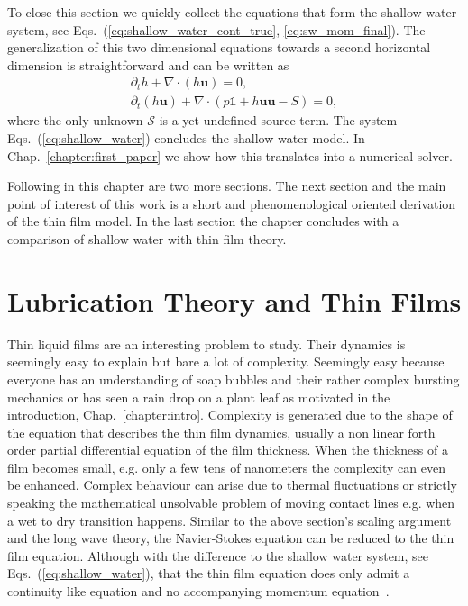 To close this section we quickly collect the equations that form the shallow water system, see Eqs.~(\ref{eq:shallow_water_cont_true}, \ref{eq:sw_mom_final}).
The generalization of this two dimensional equations towards a second horizontal dimension is straightforward and can be written as~\cite{Salmon:1999:0022-2402:503, PhysRevE.65.036309, thommes2007lattice}
\begin{gather}\label{eq:shallow_water}
        \partial_t h + \nabla \cdot (h\mathbf{u}) = 0, \\
        \partial_t (h\mathbf{u}) + \nabla\cdot (p \mathbb{1} + h\mathbf{u}\mathbf{u} - S) = 0, 
\end{gather}
where the only unknown $\mathcal{S}$ is a yet undefined source term. 
The system Eqs.~(\ref{eq:shallow_water}) concludes the shallow water model. 
In Chap.~\ref{chapter:first_paper} we show how this translates into a numerical solver.

Following in this chapter are two more sections.
The next section and the main point of interest of this work is a short and phenomenological oriented derivation of the thin film model.
In the last section the chapter concludes with a comparison of shallow water with thin film theory.

\section{Lubrication Theory and Thin Films}
\label{sec:thin_films}
Thin liquid films are an interesting problem to study.
Their dynamics is seemingly easy to explain but bare a lot of complexity.
Seemingly easy because everyone has an understanding of soap bubbles and their rather complex bursting mechanics or has seen a rain drop on a plant leaf as motivated in the introduction, Chap.~\ref{chapter:intro}.
Complexity is generated due to the shape of the equation that describes the thin film dynamics, usually a non linear forth order partial differential equation of the film thickness.
When the thickness of a film becomes small, e.g. only a few tens of nanometers the complexity can even be enhanced. 
Complex behaviour can arise due to thermal fluctuations or strictly speaking the mathematical unsolvable problem of moving contact lines e.g. when a wet to dry transition happens.
Similar to the above section's scaling argument and the long wave theory, the Navier-Stokes equation can be reduced to the thin film equation. 
Although with the difference to the shallow water system, see Eqs.~(\ref{eq:shallow_water}), that the thin film equation does only admit a continuity like equation and no accompanying momentum equation~\cite{RevModPhys.69.931, RevModPhys.57.827, RevModPhys.81.1131}.

